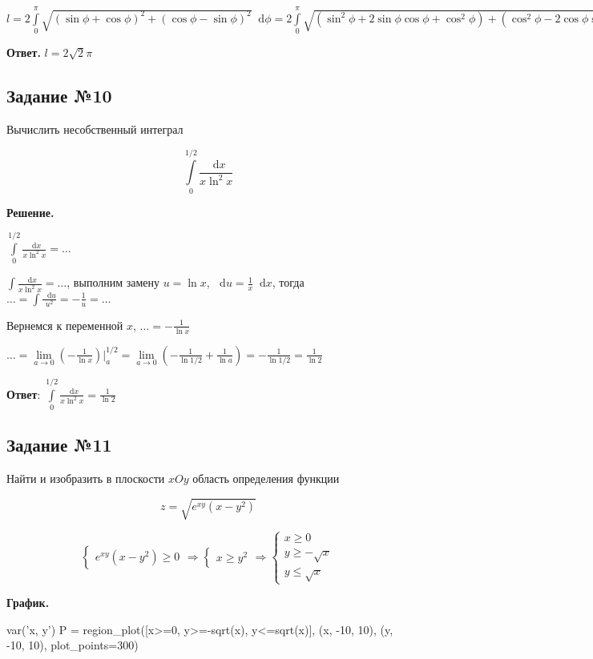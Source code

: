 \documentclass{article}
\newcommand*\diff{\mathop{}\!\mathrm{d}}
\begin{document}
$l = 2 \int\limits_{0}^{\pi} \sqrt{(\sin \phi + \cos \phi)^2 + (\cos \phi - \sin \phi)^2} \diff \phi = 2 \int\limits_{0}^{\pi} \sqrt{(\sin^2 \phi + 2 \sin \phi \cos \phi + \cos^2 \phi) + (\cos^2 \phi - 2 \cos \phi \sin \phi + \sin^2 \phi)} \diff \phi = 2 \int\limits_{0}^{\pi} \sqrt{2 \sin^2 \phi + 2 \cos^2 \phi} \diff \phi = 2 \int\limits_{0}^{\pi} \sqrt{2} \diff \phi = 2 \sqrt{2} \pi$

\hfill

\textbf{Ответ.} $l = 2 \sqrt{2} \pi$

\subsection{Задание №10}

Вычислить несобственный интеграл

$$
\int\limits_{0}^{1/2} \frac{\diff x}{x \ln^2 x}
$$

\textbf{Решение.}


$\int\limits_{0}^{1/2} \frac{\diff x}{x \ln^2 x} = \dots$

\hfill

$\int \frac{\diff x}{x \ln^2 x} = \dots$, выполним замену $u = \ln x$, $\diff u = \frac{1}{x} \diff x$, тогда $\dots = \int \frac{\diff u}{u^2} = - \frac{1}{u}  = \dots$

Вернемся к переменной $x$, $\dots = -\frac{1}{\ln x}$

\hfill

$\dots = \lim\limits_{a \to 0} (-\frac{1}{\ln x}) \bigg|_{a}^{1/2} = \lim\limits_{a \to 0} (-\frac{1}{\ln 1/2} + \frac{1}{\ln a}) = -\frac{1}{\ln 1/2} = \frac{1}{\ln 2}$

\hfill

\textbf{Ответ}: $\int\limits_{0}^{1/2} \frac{\diff x}{x \ln^2 x} = \frac{1}{\ln 2}$

\subsection{Задание №11}

Найти и изобразить в плоскости $x O y$ область определения функции

$$
z = \sqrt{e^{x y} (x - y^2)}
$$

\begin{equation}
  \begin{cases}
    e^{x y} (x - y^2) \ge 0
  \end{cases} \Longrightarrow
  \begin{cases}
    x \ge y^2
  \end{cases} \Longrightarrow
  \begin{cases}
    x \ge 0 \\
    y \ge - \sqrt{x} \\
    y \le \sqrt{x}
  \end{cases}
\end{equation}

\textbf{График.}

\begin{sagesilent}
 var('x, y')
 P = region_plot([x>=0, y>=-sqrt(x), y<=sqrt(x)], (x, -10, 10), (y, -10, 10), plot_points=300)
\end{sagesilent}

\begin{center}
\end{center}
\end{document}
